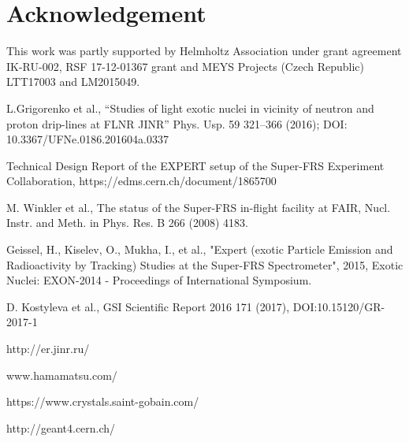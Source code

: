 \documentclass{webofc}
\newcommand{\er}{\textmd{EXPERTroot}}
\begin{document}
	
\section{Acknowledgement}
This  work was partly supported by Helmholtz Association under grant agreement IK-RU-002, RSF 17-12-01367 grant and MEYS Projects (Czech Republic) LTT17003 and LM2015049.

	
\begin{thebibliography}{99}
	L.Grigorenko et al., “Studies of light exotic nuclei in vicinity of neutron and proton drip-lines at FLNR JINR” Phys. Usp. 59 321–366 (2016); DOI: 10.3367/UFNe.0186.201604a.0337
	
	
	Technical Design Report of the EXPERT setup of the Super-FRS Experiment Collaboration, https;//edms.cern.ch/document/1865700
	
	M. Winkler et al., The status of the Super-FRS in-flight facility at FAIR, Nucl. Instr. and Meth. in Phys. Res. B 266 (2008) 4183.
	
	Geissel, H., Kiselev, O., Mukha, I., et al., "Expert (exotic Particle Emission and Radioactivity by Tracking) Studies at the Super-FRS Spectrometer", 2015, Exotic Nuclei: EXON-2014 - Proceedings of International Symposium.
	
	D. Kostyleva et al., GSI Scientific Report 2016 171 (2017), DOI:10.15120/GR-2017-1
	
	http://er.jinr.ru/
	
	www.hamamatsu.com/
	
	https://www.crystals.saint-gobain.com/
	
	http://geant4.cern.ch/
	
	
\end{thebibliography}
\end{document}
